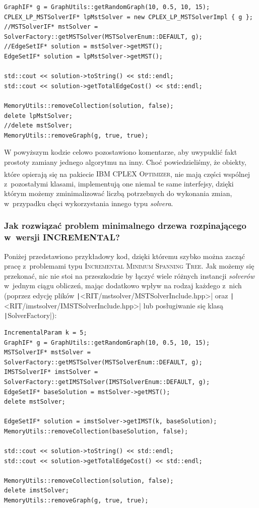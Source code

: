 \begin{verbatim}
GraphIF* g = GraphUtils::getRandomGraph(10, 0.5, 10, 15);
CPLEX_LP_MSTSolverIF* lpMstSolver = new CPLEX_LP_MSTSolverImpl { g };
//MSTSolverIF* mstSolver = SolverFactory::getMSTSolver(MSTSolverEnum::DEFAULT, g);
//EdgeSetIF* solution = mstSolver->getMST();
EdgeSetIF* solution = lpMstSolver->getMST();

std::cout << solution->toString() << std::endl;
std::cout << solution->getTotalEdgeCost() << std::endl;

MemoryUtils::removeCollection(solution, false);
delete lpMstSolver;
//delete mstSolver;
MemoryUtils::removeGraph(g, true, true);
\end{verbatim}

W powyższym kodzie celowo pozostawiono komentarze, aby uwypuklić fakt prostoty zamiany jednego algorytmu na inny. Choć powiedzieliśmy, że obiekty, które opierają się na pakiecie \textsc{IBM\textsuperscript{\textregistered} CPLEX\textsuperscript{\textregistered} Optimizer}, nie mają części wspólnej z~pozostałymi klasami, implementują one niemal te same interfejsy, dzięki którym możemy zminimalizować liczbą potrzebnych do wykonania zmian, w~przypadku chęci wykorzystania innego typu \textit{solvera}.

\subsubsection{Jak rozwiązać problem minimalnego drzewa rozpinającego w~wersji INCREMENTAL?}

Poniżej przedstawiono przykładowy kod, dzięki któremu szybko można zacząć pracę z~problemami typu \textsc{Incremental Minimum Spanning Tree}. Jak możemy się przekonać, nic nie stoi na przeszkodzie by łączyć wiele różnych instancji \textit{solverów} w~jednym ciągu obliczeń, mając dodatkowo wpływ na rodzaj każdego z~nich (poprzez edycję plików \texttt|<RIT/mstsolver/MSTSolverInclude.hpp>| oraz \texttt|<RIT/imstsolver/IMSTSolverInclude.hpp>| lub posługiwanie się klasą \texttt|SolverFactory|):

\begin{verbatim}
IncrementalParam k = 5;
GraphIF* g = GraphUtils::getRandomGraph(10, 0.5, 10, 15);
MSTSolverIF* mstSolver = SolverFactory::getMSTSolver(MSTSolverEnum::DEFAULT, g);
IMSTSolverIF* imstSolver = SolverFactory::getIMSTSolver(IMSTSolverEnum::DEFAULT, g);
EdgeSetIF* baseSolution = mstSolver->getMST();
delete mstSolver;

EdgeSetIF* solution = imstSolver->getIMST(k, baseSolution);
MemoryUtils::removeCollection(baseSolution, false);

std::cout << solution->toString() << std::endl;
std::cout << solution->getTotalEdgeCost() << std::endl;

MemoryUtils::removeCollection(solution, false);
delete imstSolver;
MemoryUtils::removeGraph(g, true, true);
\end{verbatim}

